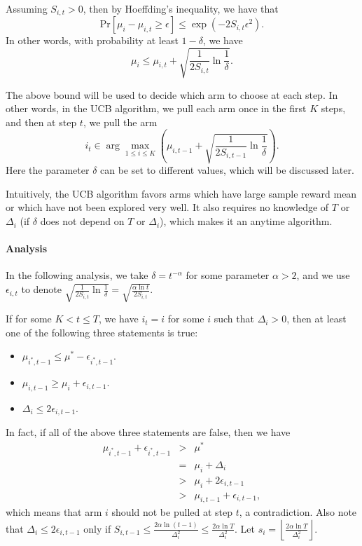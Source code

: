 \documentclass[openany]{book}
\theoremstyle{definition}
\theoremstyle{remark}
\begin{document}
Assuming $S_{i,t}>0$, then by Hoeffding's inequality, we have that
\begin{equation}
    \mathrm{Pr}[\mu_i-\mu_{i,t}\ge\epsilon]\le\exp(-2S_{i,t}\epsilon^2).
\end{equation}
In other words, with probability at least $1-\delta$, we have
\begin{equation}\label{UCB}
    \mu_i\le\mu_{i,t}+\sqrt{\frac{1}{2S_{i,t}}\ln \frac{1}{\delta}}.
\end{equation}

The above bound will be used to decide which arm to choose at each step. In other words, in the UCB algorithm, we pull each arm once in the first $K$ steps, and then at step $t$, we pull the arm
\begin{equation}
    i_t\in\arg\max_{1\le i\le K}\left(\mu_{i,t-1}+\sqrt{\frac{1}{2S_{i,t-1}}\ln \frac{1}{\delta}}\right).
\end{equation}
Here the parameter $\delta$ can be set to different values, which will be discussed later.

Intuitively, the UCB algorithm favors arms which have large sample reward mean or which have not been explored very well. It also requires no knowledge of $T$ or $\Delta_i$ (if $\delta$ does not depend on $T$ or $\Delta_i$), which makes it an anytime algorithm.

\paragraph{Analysis}
In the following analysis, we take $\delta=t^{-\alpha}$ for some parameter $\alpha>2$, and we use $\epsilon_{i,t}$ to denote $\sqrt{\frac{1}{2S_{i,t}}\ln \frac{1}{\delta}}=\sqrt{\frac{\alpha\ln t}{2S_{i,t}}}$.

If for some $K<t\le T$, we have $i_t=i$ for some $i$ such that $\Delta_i>0$, then at least one of the following three statements is true:
\begin{itemize}
    \item $\mu_{i^*,t-1}\le\mu^*-\epsilon_{i^*,t-1}$.
    \item $\mu_{i,t-1}\ge\mu_i+\epsilon_{i,t-1}$.
    \item $\Delta_i\le2\epsilon_{i,t-1}$.
\end{itemize}
In fact, if all of the above three statements are false, then we have
\begin{equation*}
    \begin{array}{rcl}
        \mu_{i^*,t-1}+\epsilon_{i^*,t-1} & > & \mu^* \\
         & = & \mu_i+\Delta_i \\
         & > & \mu_i+2\epsilon_{i,t-1} \\
         & > & \mu_{i,t-1}+\epsilon_{i,t-1},
    \end{array}
\end{equation*}
which means that arm $i$ should not be pulled at step $t$, a contradiction. Also note that $\Delta_i\le2\epsilon_{i,t-1}$ only if $S_{i,t-1}\le \frac{2\alpha\ln(t-1)}{\Delta_i^2}\le \frac{2\alpha\ln T}{\Delta_i^2}$. Let $s_i=\left\lfloor \frac{2\alpha\ln T}{\Delta_i^2}\right\rfloor$.
\end{document}
